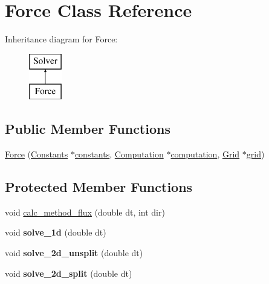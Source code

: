 \hypertarget{classForce}{\section{Force Class Reference}
\label{classForce}
}
Inheritance diagram for Force\-:\begin{figure}[H]
\begin{center}
\leavevmode
\includegraphics[height=2.000000cm]{classForce}
\end{center}
\end{figure}
\subsection*{Public Member Functions}
\begin{DoxyCompactItemize}
\item 
\hyperlink{classForce_a7649ae54f95bba54f4e15784f92900e6}{Force} (\hyperlink{classConstants}{Constants} $\ast$\hyperlink{classSolver_af8791d3a5042e7be5980ae3247cb60de}{constants}, \hyperlink{classComputation}{Computation} $\ast$\hyperlink{classSolver_a158efd10f04099b8be28561f990b646a}{computation}, \hyperlink{classGrid}{Grid} $\ast$\hyperlink{classSolver_a147ba19192faf8f24dadfc569f3d403f}{grid})
\end{DoxyCompactItemize}
\subsection*{Protected Member Functions}
\begin{DoxyCompactItemize}
\item 
void \hyperlink{classForce_a6c395b2d375796332c6d688760c79dc4}{calc\-\_\-method\-\_\-flux} (double dt, int dir)
\item 
\hypertarget{classForce_ade35a929b504e623e66453f0a3d0cb2a}{void {\bfseries solve\-\_\-1d} (double dt)}\label{classForce_ade35a929b504e623e66453f0a3d0cb2a}

\item 
\hypertarget{classForce_a433b3d8f8ffbb5e3761d7e92397ce2a0}{void {\bfseries solve\-\_\-2d\-\_\-unsplit} (double dt)}\label{classForce_a433b3d8f8ffbb5e3761d7e92397ce2a0}

\item 
\hypertarget{classForce_a3aab917b725dd97e966b41f3dc6c3d8f}{void {\bfseries solve\-\_\-2d\-\_\-split} (double dt)}\label{classForce_a3aab917b725dd97e966b41f3dc6c3d8f}

\end{DoxyCompactItemize}
